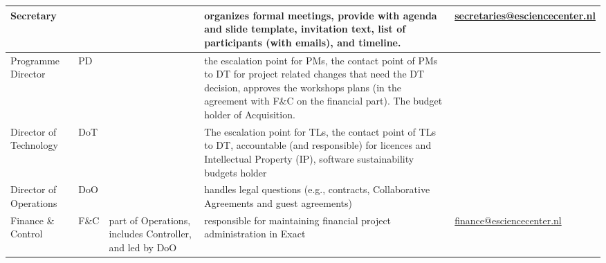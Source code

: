 \documentclass[11pt]{article}
\begin{document}
\begin{tabularx}{\linewidth}{p{}|p{}|p{}|p{}|p{}}
Secretary                                          &                       &                                                                                                                   & organizes formal meetings, provide with agenda and slide template, invitation text, list of participants (with emails), and timeline.                                                                                                  &  \href{mailto:secretaries@esciencecenter.nl}{secretaries@esciencecenter.nl}                                                                                         \\\hline
Programme Director                                 & PD                    &                                                                                                                   & the escalation point for PMs, the contact point of PMs to DT for project related changes that need the DT decision, approves the workshops plans (in the agreement with F\&C on the financial part). The budget holder of Acquisition. &                                                                                                                                      \\\hline
Director of Technology                             & DoT                   &                                                                                                                   & The escalation point for TLs, the contact point of TLs to DT, accountable (and responsible) for licences and Intellectual Property (IP), software sustainability budgets holder                                                        &                                                                                                                                      \\\hline
Director of Operations                             & DoO                   &                                                                                                                   & handles legal questions (e.g., contracts, Collaborative Agreements and guest agreements)                                                                                               &                                                                                                                                      \\\hline
Finance \& Control                                 & F\&C                  & part of Operations, includes Controller, and led by DoO                                                           & responsible for maintaining financial project administration in Exact                                                                                                                                                                  & \href{mailto:finance@esciencecenter.nl}{finance@esciencecenter.nl}                                                                                            \\\hline

\end{tabularx}
\end{document}
